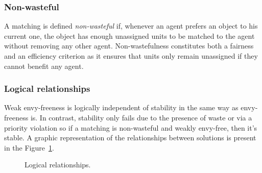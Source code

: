 \subsubsection{Non-wasteful}%

A matching is defined \textit{non-wasteful} if, whenever an agent prefers an object to his current one, the object has enough unassigned units to be matched to the agent without removing any other agent. Non-wastefulness constitutes both a fairness and an efficiency criterion as it ensures that units only remain unassigned if they cannot benefit any agent.


\subsubsection{Logical relationships}%

Weak envy-freeness is logically independent of stability in the same way as envy-freeness is. In contrast, stability only fails due to the presence of waste or via a priority violation so if a matching is non-wasteful and weakly envy-free, then it's stable. A graphic representation of the relationships between solutions is present in the Figure~\ref{fig:matching}.

\begin{figure}[!htb]
    \centering{%
        \resizebox{0.9\columnwidth}{!}{%
            \def\svgwidth{\columnwidth}
            
        }
    }
    \caption{Logical relationships.}
    \label{fig:matching}
\end{figure}
